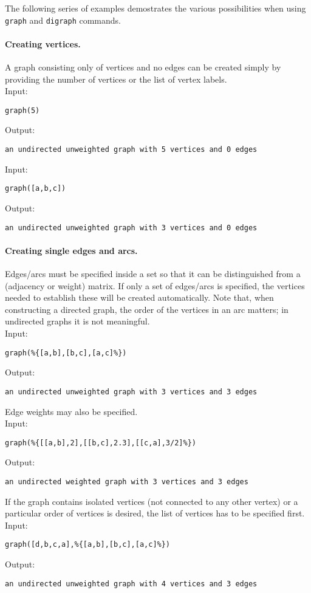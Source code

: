 \documentclass[a4paper,11pt]{article}
\begin{document}
The following series of examples demostrates the various possibilities when using {\tt graph} and {\tt digraph} commands.

\paragraph{Creating vertices.}
A graph consisting only of vertices and no edges can be created simply by providing the number of vertices or the list of vertex labels.\\
Input:
\begin{center}
  \tt graph(5)
\end{center}
Output:
\begin{center}
  \tt an undirected unweighted graph with 5 vertices and 0 edges
\end{center}
Input:
\begin{center}
  \tt graph([a,b,c])
\end{center}
Output:
\begin{center}
  \tt an undirected unweighted graph with 3 vertices and 0 edges
\end{center}

\paragraph{Creating single edges and arcs.}
Edges/arcs must be specified inside a set so that it can be distinguished from a (adjacency or weight) matrix. If only a set of edges/arcs is specified, the vertices needed to establish these will be created automatically. Note that, when constructing a directed graph, the order of the vertices in an arc matters; in undirected graphs it is not meaningful.\\
Input:
\begin{center}
  \tt graph(\%\{[a,b],[b,c],[a,c]\%\})
\end{center}
Output:
\begin{center}
  \tt an undirected unweighted graph with 3 vertices and 3 edges
\end{center}
Edge weights may also be specified.\\
Input:
\begin{center}
  \tt graph(\%\{[[a,b],2],[[b,c],2.3],[[c,a],3/2]\%\})
\end{center}
Output:
\begin{center}
  \tt an undirected weighted graph with 3 vertices and 3 edges
\end{center}
If the graph contains isolated vertices (not connected to any other vertex) or a particular order of vertices is desired, the list of vertices has to be specified first.\\
Input:
\begin{center}
  \tt graph([d,b,c,a],\%\{[a,b],[b,c],[a,c]\%\})
\end{center}
Output:
\begin{center}
  \tt an undirected unweighted graph with 4 vertices and 3 edges
\end{center}
\end{document}
